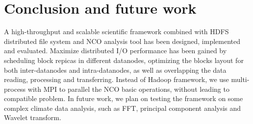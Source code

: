 \documentclass[preprint,12pt]{elsarticle}
\begin{document}
\section{Conclusion and future work}
A high-throughput and scalable scientific framework combined with HDFS distributed file system and NCO analysis tool has been designed, 
implemented and evaluated. Maximize distributed I/O performance has been gained by scheduling block repicas in different datanodes, 
optimizing the blocks layout for both inter-datanodes and intra-datanodes,  as well as overlapping the data reading, processing and 
transferring. Instead of Hadoop framework, we use multi-process with MPI to parallel the NCO basic operations, without leading to compatible 
problem. In future work, we plan on testing the framework on some complex climate data analysis, such as FFT, principal component analysis 
and Wavelet transform.

	


 



\begin{thebibliography}{00}



\end{thebibliography}
\end{document}
